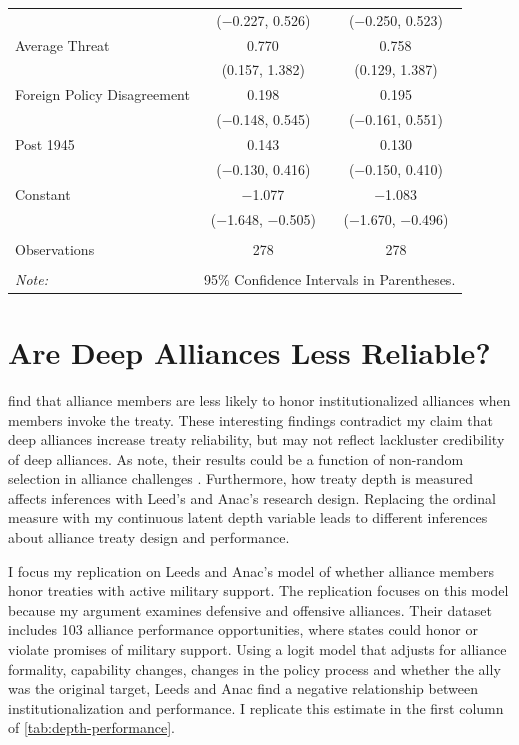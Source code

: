 \documentclass[12pt]{article}
\begin{document}
\begin{table}[!htbp]
\begin{tabular}{@{\extracolsep{5pt}}lcc}
  & ($-$0.227, 0.526) & ($-$0.250, 0.523) \\ 
  Average Threat & 0.770$^{}$ & 0.758$^{}$ \\ 
  & (0.157, 1.382) & (0.129, 1.387) \\ 
  Foreign Policy Disagreement & 0.198 & 0.195 \\ 
  & ($-$0.148, 0.545) & ($-$0.161, 0.551) \\ 
  Post 1945 & 0.143 & 0.130 \\ 
  & ($-$0.130, 0.416) & ($-$0.150, 0.410) \\ 
  Constant & $-$1.077$^{}$ & $-$1.083$^{}$ \\ 
  & ($-$1.648, $-$0.505) & ($-$1.670, $-$0.496) \\ 
 \hline \\[-1.8ex] 
Observations & 278 & 278 \\ 
\hline 
\hline \\[-1.8ex] 
\textit{Note:}  & \multicolumn{2}{r}{95\% Confidence Intervals in Parentheses.} \\ 
\end{tabular} 
\end{table} 





\section{Are Deep Alliances Less Reliable?} 


\citet{LeedsAnac2005} find that alliance members are less likely to honor institutionalized alliances when members invoke the treaty.
These interesting findings contradict my claim that deep alliances increase treaty reliability, but may not reflect lackluster credibility of deep alliances. 
As \citet[pg. 198]{LeedsAnac2005} note, their results could be a function of non-random selection in alliance challenges \citep{Smith1995}. 
Furthermore, how treaty depth is measured affects inferences with Leed's and Anac's research design.
Replacing the ordinal measure with my continuous latent depth variable leads to different inferences about alliance treaty design and performance. 



I focus my replication on Leeds and Anac's model of whether alliance members honor treaties with active military support. 
The replication focuses on this model because my argument examines defensive and offensive alliances. 
Their dataset includes 103 alliance performance opportunities, where states could honor or violate promises of military support. 
Using a logit model that adjusts for alliance formality, capability changes, changes in the policy process and whether the ally was the original target, Leeds and Anac find a negative relationship between institutionalization and performance. 
I replicate this estimate in the first column of \autoref{tab:depth-performance}. 
\end{document}
